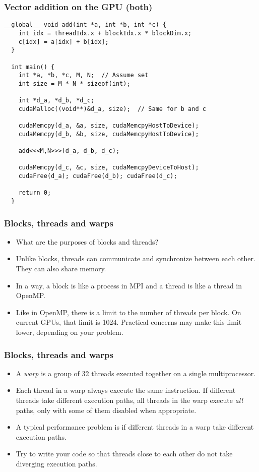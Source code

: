 \begin{frame}[fragile]
  \frametitle{Vector addition on the GPU (both)}
  \begin{lstlisting}[style=cuda, basicstyle=\ttfamily\scriptsize]
  __global__ void add(int *a, int *b, int *c) {
    int idx = threadIdx.x + blockIdx.x * blockDim.x;
    c[idx] = a[idx] + b[idx];
  }

  int main() {
    int *a, *b, *c, M, N;  // Assume set
    int size = M * N * sizeof(int);

    int *d_a, *d_b, *d_c;
    cudaMalloc((void**)&d_a, size);  // Same for b and c

    cudaMemcpy(d_a, &a, size, cudaMemcpyHostToDevice);
    cudaMemcpy(d_b, &b, size, cudaMemcpyHostToDevice);

    add<<<M,N>>>(d_a, d_b, d_c);

    cudaMemcpy(d_c, &c, size, cudaMemcpyDeviceToHost);
    cudaFree(d_a); cudaFree(d_b); cudaFree(d_c);

    return 0;
  }
  \end{lstlisting}
\end{frame}

\begin{frame}
  \frametitle{Blocks, threads and warps}
  \begin{itemize}
  \item What are the purposes of blocks and threads?
  \item Unlike blocks, threads can communicate and synchronize between each
    other. They can also share memory.
  \item In a way, a block is like a process in MPI and a thread is like a thread
    in OpenMP.
  \item Like in OpenMP, there is a limit to the number of threads per block. On
    current GPUs, that limit is 1024. Practical concerns may make this limit
    lower, depending on your problem.
  \end{itemize}
\end{frame}

\begin{frame}
  \frametitle{Blocks, threads and warps}
  \begin{itemize}
  \item A \emph{warp} is a group of 32 threads executed together on a single
    multiprocessor.
  \item Each thread in a warp always execute the same instruction. If different
    threads take different execution paths, all threads in the warp execute
    \emph{all} paths, only with some of them disabled when appropriate.
  \item A typical performance problem is if different threads in a warp take
    different execution paths.
  \item Try to write your code so that threads close to each other do not take
    diverging execution paths.
  \end{itemize}
\end{frame}


